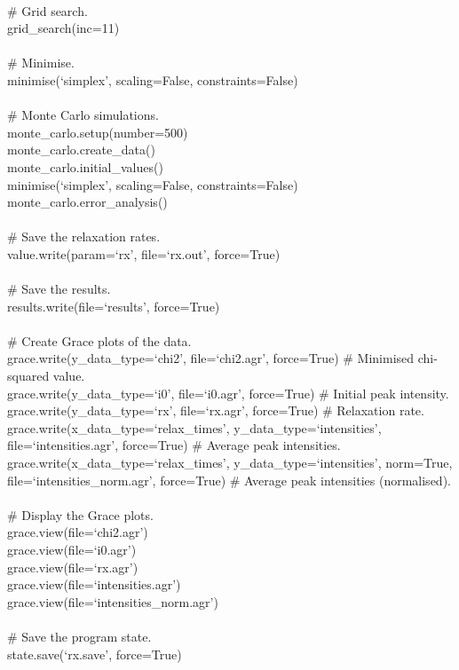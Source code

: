\begin{exampleenv}
 \\
\# Grid search. \\
grid\_search(inc=11) \\
 \\
\# Minimise. \\
minimise(`simplex', scaling=False, constraints=False) \\
 \\
\# Monte Carlo simulations. \\
monte\_carlo.setup(number=500) \\
monte\_carlo.create\_data() \\
monte\_carlo.initial\_values() \\
minimise(`simplex', scaling=False, constraints=False) \\
monte\_carlo.error\_analysis() \\
 \\
\# Save the relaxation rates. \\
value.write(param=`rx', file=`rx.out', force=True) \\
 \\
\# Save the results. \\
results.write(file=`results', force=True) \\
 \\
\# Create Grace plots of the data. \\
grace.write(y\_data\_type=`chi2', file=`chi2.agr', force=True)    \# Minimised chi-squared value. \\
grace.write(y\_data\_type=`i0', file=`i0.agr', force=True)    \# Initial peak intensity. \\
grace.write(y\_data\_type=`rx', file=`rx.agr', force=True)    \# Relaxation rate. \\
grace.write(x\_data\_type=`relax\_times', y\_data\_type=`intensities', file=`intensities.agr', force=True)    \# Average peak intensities. \\
grace.write(x\_data\_type=`relax\_times', y\_data\_type=`intensities', norm=True, file=`intensities\_norm.agr', force=True)    \# Average peak intensities (normalised). \\
 \\
\# Display the Grace plots. \\
grace.view(file=`chi2.agr') \\
grace.view(file=`i0.agr') \\
grace.view(file=`rx.agr') \\
grace.view(file=`intensities.agr') \\
grace.view(file=`intensities\_norm.agr') \\
 \\
\# Save the program state. \\
state.save(`rx.save', force=True)
\end{exampleenv}

